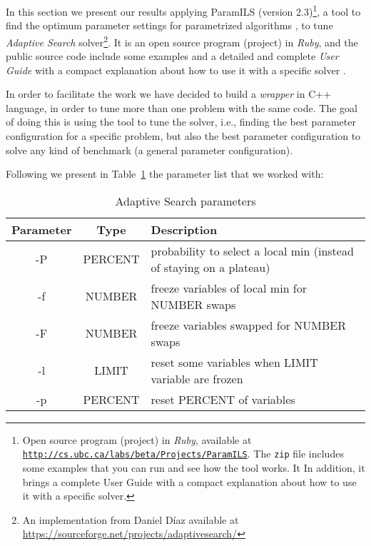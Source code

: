 


In this section we present our results applying {\sc ParamILS} (version 2.3)\footnote{Open source program (project) in {\it Ruby}, available at \href{http://cs.ubc.ca/labs/beta/Projects/ParamILS}{\texttt{http://cs.ubc.ca/labs/beta/Projects/ParamILS}}. The \texttt{zip} file includes some examples that you can run and see how the tool works. It In addition, it brings a complete User Guide with a compact explanation about how to use it with a specific solver.}, a tool to find the optimum parameter settings for parametrized algorithms \cite{Hutter2009}, to tune {\it Adaptive Search} solver\footnote{An implementation from Daniel D\'{i}az available at \href{https://sourceforge.net/projects/adaptivesearch/}{https://sourceforge.net/projects/adaptivesearch/}}. It is an open source program (project) in {\it Ruby}, and the public source code include some examples and a detailed and complete \textit{User Guide} with a compact explanation about how to use it with a specific solver \cite{Hutter2008}. 

In order to facilitate the work we have decided to build a {\it wrapper} in C++ language, in order to tune more than one problem with the same code. The goal of doing this is using the tool to tune the solver, i.e., finding the best parameter configuration for a specific problem, but also the best parameter configuration to solve any kind of benchmark (a general parameter configuration).

\nocite{Rickard}

Following we present in Table~\ref{table:param} the parameter list that we worked with:

\begin{table}[ht] 
\caption{Adaptive Search parameters}
\centering 
\begin{tabular}{c c l}
\hline\hline
Parameter & Type & Description \\ [0.5ex]
\hline
-P & PERCENT & probability to select a local min (instead of staying on a plateau) \\
-f & NUMBER & freeze variables of local min for NUMBER swaps \\ 
-F & NUMBER & freeze variables swapped for NUMBER swaps \\ 
-l & LIMIT & reset some variables when LIMIT variable are frozen \\ 
-p & PERCENT & reset PERCENT of variables \\ [1ex]
\hline
\end{tabular} 
\label{table:param}
\end{table} 

